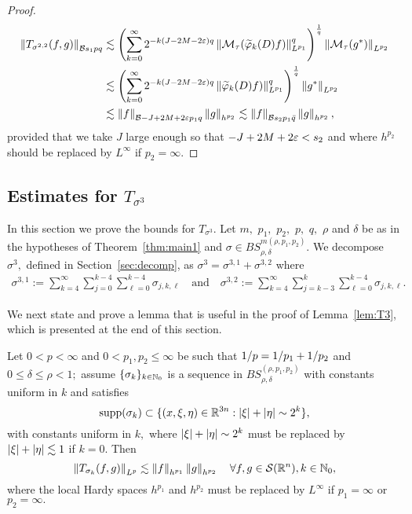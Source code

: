 \begin{proof}
\begin{align*}
\left\|T_{\sigma^{2,2}}(f,g)\right\|_{\mathcal{B}{s_1}{p}{q}} & \lesssim \left( \sum\limits_{k=0}^\infty 2^{-k  (J-2M -2\varepsilon)q} \left\|\mathcal{M}_\tau(\widetilde{\varphi}_k(D)f)\right\|_{L^{p_1}}^q  \right)^\frac{1}{q}\left\|\mathcal{M}_\tau(g^*)\right\|_{L^{p_2}}\\
& \lesssim \left( \sum\limits_{k=0}^\infty 2^{-k  (J-2M -2\varepsilon)q} \left\|\widetilde{\varphi}_k(D)f)\right\|_{L^{p_1}}^q  \right)^\frac{1}{q} \left\|g^*\right\|_{L^{p_2}}\\
& \lesssim \left\|f\right\|_{\mathcal{B}{-J +2M +2\varepsilon}{p_1}{q}} \left\|g\right\|_{h^{p_2}} \lesssim  \left\|f\right\|_{\mathcal{B}{s_2}{p_1}{\bar{q}}} \left\|g\right\|_{h^{p_2}},
\end{align*}
provided that we take $J$ large enough so that $-J +2M +2\varepsilon < s_2$ and where $h^{p_2}$ should be replaced by $L^\infty$ if $p_2=\infty.$
\end{proof}




\subsection{Estimates for $T_{\sigma^3}$}

In this section we prove the bounds for $T_{\sigma^3}$. Let $m,$ $p_1,$ $p_2,$ $p,$ $q,$   $\rho$ and $\delta$ be as in the hypotheses of Theorem~\ref{thm:main1} and $\sigma\in BS^{m(\rho,p_1,p_2)}_{\rho,\delta}.$ We decompose $\sigma^3,$ defined in Section~\ref{sec:decomp}, as $\sigma^3=\sigma^{3,1}+\sigma^{3,2}$ where
\begin{align*}
\sigma^{3,1}:=  \sum\limits_{k=4}^\infty \sum\limits_{j=0}^{k-4} \sum\limits_{\ell =0}^{k-4} \sigma_{j,k,\ell}\quad \text{and}\quad \sigma^{3,2}:= \sum\limits_{k=4}^\infty \sum\limits_{j=k-3}^k \sum\limits_{\ell =0}^{k-4} \sigma_{j,k,\ell}.
\end{align*}



We next state and prove a lemma that is useful in the proof of Lemma~\ref{lem:T3}, which is presented at the end of this section.

\begin{lemma}\label{lem:Tsk:bound} Let $0<p<\infty$ and $0<p_1,p_2\le \infty$  be such that $1/p=1/p_1+1/p_2$ and $0\le \delta\le \rho<1;$ assume $\{\sigma_k\}_{k\in \mathbb{N}_0}$ is a sequence in $BS^{(\rho,p_1,p_2)}_{\rho,\delta}$  with constants uniform in $k$ and satisfies 
\begin{equation*}
{\rm{supp}}(\sigma_k)\subset \{(x,\xi,\eta)\in \mathbb{R}^{3n}: \left\vert \xi \right\vert+\left\vert \eta \right\vert\sim 2^k\},
\end{equation*}
with constants uniform in $k,$  where  $\left\vert \xi \right\vert+\left\vert \eta \right\vert\sim 2^k$ must be replaced by $\left\vert \xi \right\vert+\left\vert \eta \right\vert\lesssim 1$ if $k=0.$
Then 
\begin{equation*}
\left\|T_{\sigma_k}(f,g)\right\|_{L^p}\lesssim \left\|f\right\|_{h^{p_1}}\left\|g\right\|_{h^{p_2}}\quad \forall f,g\in{\mathcal{S}}({{\mathbb R}^n}),k\in\mathbb{N}_0,
\end{equation*}
where the local Hardy spaces $h^{p_1}$ and $h^{p_2}$ must be replaced by $L^\infty$ if $p_1=\infty$ or $p_2=\infty.$
\end{lemma}

